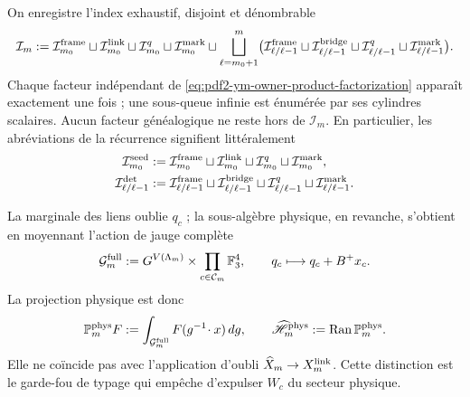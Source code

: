On enregistre l’index exhaustif, disjoint et dénombrable
\begin{equation}\label{eq:pdf2-ym-owner-exhaustive-index}
 \mathcal I_m
 :=\mathcal I_{m_0}^{\rm frame}
 \sqcup\mathcal I_{m_0}^{\rm link}
 \sqcup\mathcal I_{m_0}^{q}
 \sqcup\mathcal I_{m_0}^{\rm mark}
 \sqcup\bigsqcup_{\ell=m_0+1}^{m}
 \bigl(
   \mathcal I_{\ell/\ell-1}^{\rm frame}
   \sqcup\mathcal I_{\ell/\ell-1}^{\rm bridge}
   \sqcup\mathcal I_{\ell/\ell-1}^{q}
   \sqcup\mathcal I_{\ell/\ell-1}^{\rm mark}
 \bigr).
\end{equation}
Chaque facteur indépendant de \eqref{eq:pdf2-ym-owner-product-factorization} apparaît
exactement une fois ; une sous-queue infinie est énumérée par ses cylindres scalaires. Aucun
facteur généalogique ne reste hors de $\mathcal I_m$.
En particulier, les abréviations de la récurrence signifient littéralement
\begin{equation}\label{eq:pdf2-ym-owner-index-abbreviations}
 \begin{aligned}
 \mathcal I_{m_0}^{\rm seed}
 &:={\mathcal I}_{m_0}^{\rm frame}\sqcup
    {\mathcal I}_{m_0}^{\rm link}\sqcup
    {\mathcal I}_{m_0}^{q}\sqcup
    {\mathcal I}_{m_0}^{\rm mark},\\
 \mathcal I_{\ell/\ell-1}^{\rm det}
 &:={\mathcal I}_{\ell/\ell-1}^{\rm frame}\sqcup
    {\mathcal I}_{\ell/\ell-1}^{\rm bridge}\sqcup
    {\mathcal I}_{\ell/\ell-1}^{q}\sqcup
    {\mathcal I}_{\ell/\ell-1}^{\rm mark}.
 \end{aligned}
\end{equation}

La marginale des liens oublie $q_c$ ; la sous-algèbre physique, en revanche, s’obtient
en moyennant l’action de jauge complète
\begin{equation}\label{eq:pdf2-ym-full-gauge-group}
 \mathcal G_m^{\rm full}
 :=G^{V(\Lambda_m)}\times
 \prod_{c\in\mathcal C_m}\mathbb F_3^4,
 \qquad q_c\longmapsto q_c+B^+x_c.
\end{equation}
La projection physique est donc
\begin{equation}\label{eq:pdf2-ym-full-physical-projection}
 \mathbb P_m^{\rm phys}F
 :=\int_{\mathcal G_m^{\rm full}}F(g^{-1}\!\cdot x)\,dg,
 \qquad
 \widehat{\mathscr H}_m^{\rm phys}
 :=\operatorname{Ran}\mathbb P_m^{\rm phys}.
\end{equation}
Elle ne coïncide pas avec l’application d’oubli
$\widehat X_m\to X_m^{\rm link}$. Cette distinction est le garde-fou de typage
qui empêche d’expulser $W_c$ du secteur physique.

